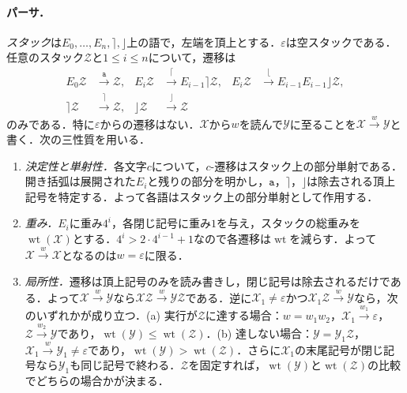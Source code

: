 \documentclass[11pt,a4paper]{ltjsarticle}
\numberwithin{equation}{section}
\theoremstyle{plain}
\theoremstyle{definition}
\theoremstyle{remark}
\newcommand{\eps}{\varepsilon}
\begin{document}
\paragraph{パーサ．}
\emph{スタック}は$E_0,\ldots,E_n,\rceil,\rfloor$上の語で，左端を頂上とする．$\eps$は空スタックである．任意のスタック$\mathcal Z$と$1\le i\le n$について，遷移は
\[
\begin{aligned}
E_0\mathcal Z&\xrightarrow{\mathtt a}\mathcal Z,&
E_i\mathcal Z&\xrightarrow{\lceil}E_{i-1}\rceil\mathcal Z,&
E_i\mathcal Z&\xrightarrow{\lfloor}E_{i-1}E_{i-1}\rfloor\mathcal Z,\\
\rceil\mathcal Z&\xrightarrow{\rceil}\mathcal Z,&
\rfloor\mathcal Z&\xrightarrow{\rfloor}\mathcal Z
\end{aligned}
\]
のみである．特に$\eps$からの遷移はない．$\mathcal X$から$w$を読んで$\mathcal Y$に至ることを$\mathcal X\xrightarrow{w}\mathcal Y$と書く．次の三性質を用いる．
\begin{enumerate}[label=\textup{(P\arabic*)},leftmargin=2.6em]
\item \emph{決定性と単射性．}各文字$c$について，$c$-遷移はスタック上の部分単射である．開き括弧は展開された$E_i$と残りの部分を明かし，$\mathtt a$，$\rceil$，$\rfloor$は除去される頂上記号を特定する．よって各語はスタック上の部分単射として作用する．
\item \emph{重み．}$E_i$に重み$4^i$，各閉じ記号に重み$1$を与え，スタックの総重みを$\operatorname{wt}(\mathcal X)$とする．$4^i>2\cdot4^{i-1}+1$なので各遷移は$\operatorname{wt}$を減らす．よって$\mathcal X\xrightarrow{w}\mathcal X$となるのは$w=\eps$に限る．
\item \emph{局所性．}遷移は頂上記号のみを読み書きし，閉じ記号は除去されるだけである．よって$\mathcal X\xrightarrow{w}\mathcal Y$なら$\mathcal X\mathcal Z\xrightarrow{w}\mathcal Y\mathcal Z$である．逆に$\mathcal X_1\ne\eps$かつ$\mathcal X_1\mathcal Z\xrightarrow{w}\mathcal Y$なら，次のいずれかが成り立つ．\textup{(a)} 実行が$\mathcal Z$に達する場合：$w=w_1w_2$，$\mathcal X_1\xrightarrow{w_1}\eps$，$\mathcal Z\xrightarrow{w_2}\mathcal Y$であり，$\operatorname{wt}(\mathcal Y)\le\operatorname{wt}(\mathcal Z)$．\textup{(b)} 達しない場合：$\mathcal Y=\mathcal Y_1\mathcal Z$，$\mathcal X_1\xrightarrow{w}\mathcal Y_1\ne\eps$であり，$\operatorname{wt}(\mathcal Y)>\operatorname{wt}(\mathcal Z)$．さらに$\mathcal X_1$の末尾記号が閉じ記号なら$\mathcal Y_1$も同じ記号で終わる．$\mathcal Z$を固定すれば，$\operatorname{wt}(\mathcal Y)$と$\operatorname{wt}(\mathcal Z)$の比較でどちらの場合かが決まる．
\end{enumerate}
\end{document}
